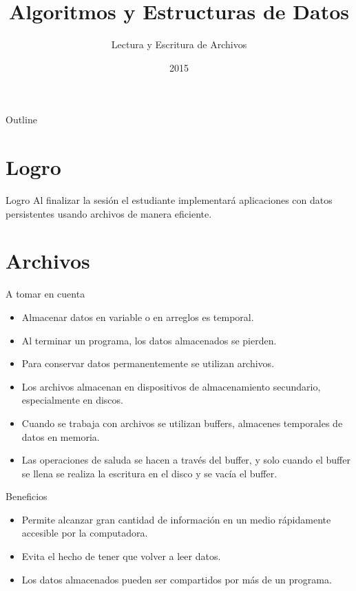 \documentclass[aspectratio=169]{beamer}
\title{Algoritmos y Estructuras de Datos}
\subtitle{Lectura y Escritura de Archivos}
\date{2015}
\institute{\href{http://www.upc.edu.pe}{Universidad Peruana de Ciencias Aplicadas}}
\begin{document}
\maketitle

\begin{frame}{Outline}
\tableofcontents
\end{frame}

\section{Logro}
\begin{frame}{Logro}
Al finalizar la sesión el estudiante implementará aplicaciones con datos
persistentes usando archivos de manera eficiente.
\end{frame}

\section{Archivos}
\begin{frame}{A tomar en cuenta}
\begin{itemize}
\item Almacenar datos en variable o en arreglos es temporal.
\item Al terminar un programa, los datos almacenados se pierden.
\item Para conservar datos permanentemente se utilizan archivos.
\item Los archivos almacenan en dispositivos de almacenamiento secundario,
especialmente en discos.
\item Cuando se trabaja con archivos se utilizan buffers, almacenes temporales
de datos en memoria.
\item Las operaciones de saluda se hacen a través del buffer, y solo cuando el
buffer se llena se realiza la escritura en el disco y se vacía el buffer.
\end{itemize}
\end{frame}

\begin{frame}{Beneficios}
\begin{itemize}
\item Permite alcanzar gran cantidad de información en un medio rápidamente
accesible por la computadora.
\item Evita el hecho de tener que volver a leer datos.
\item Los datos almacenados pueden ser compartidos por más de un programa.
\end{itemize}
\end{frame}
\end{document}

